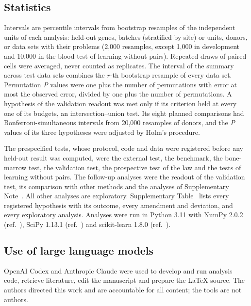 \documentclass[pdflatex,sn-vancouver-num,iicol]{sn-jnl}
\begin{document}
\subsection{Statistics}
Intervals are percentile intervals from bootstrap resamples of the independent units of each analysis\cite{efron1979}: held-out genes, batches (stratified by site) or units, donors, or data sets with their problems (2,000 resamples, except 1,000 in development and 10,000 in the blood test of learning without pairs). Repeated draws of paired cells were averaged, never counted as replicates. The interval of the summary across test data sets combines the $r$-th bootstrap resample of every data set. Permutation \textit{P} values were one plus the number of permutations with error at most the observed error, divided by one plus the number of permutations\cite{phipson2010}. A hypothesis of the validation readout was met only if its criterion held at every one of its budgets, an intersection--union test\cite{berger1982}. Its eight planned comparisons had Bonferroni-simultaneous intervals from 20,000 resamples of donors, and the \textit{P} values of its three hypotheses were adjusted by Holm's procedure\cite{holm1979}.

The prespecified tests, whose protocol, code and data were registered before any held-out result was computed, were the external test, the benchmark, the bone-marrow test, the validation test, the prospective test of the law and the tests of learning without pairs. The follow-up analyses were the readout of the validation test, its comparison with other methods and the analyses of Supplementary Note~. All other analyses are exploratory. Supplementary Table~ lists every registered hypothesis with its outcome, every amendment and deviation, and every exploratory analysis. Analyses were run in Python 3.11 with NumPy 2.0.2 (ref.~), SciPy 1.13.1 (ref.~) and scikit-learn 1.8.0 (ref.~).

\subsection{Use of large language models}
OpenAI Codex and Anthropic Claude were used to develop and run analysis code, retrieve literature, edit the manuscript and prepare the \LaTeX{} source. The authors directed this work and are accountable for all content; the tools are not authors.
\end{document}
